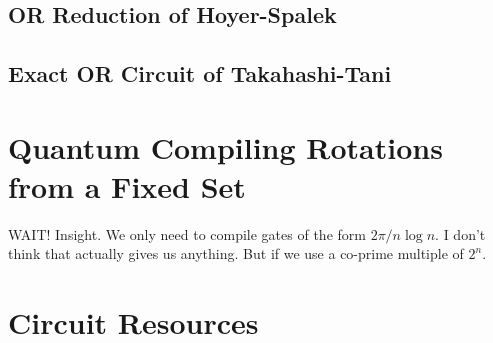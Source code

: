 \subsection{OR Reduction of Hoyer-Spalek}

\subsection{Exact OR Circuit of Takahashi-Tani}

\section{Quantum Compiling Rotations from a Fixed Set}

WAIT! Insight. We only need to compile gates of the form
$2\pi / n\log n$. I don't think that actually gives us anything.
But if we use a co-prime multiple of $2^n$.

\section{Circuit Resources}
